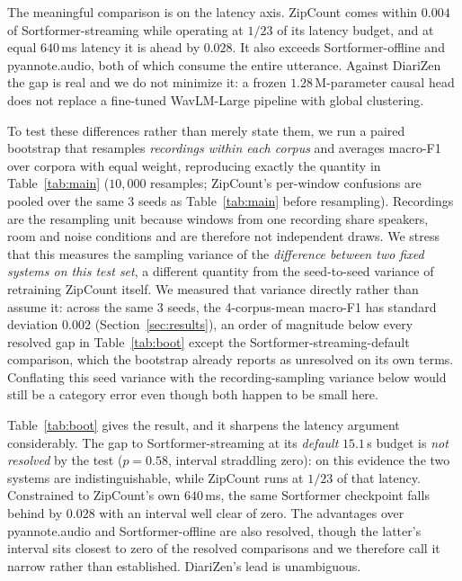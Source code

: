 \documentclass[journal]{IEEEtran}
\newcommand{\sys}{ZipCount}
\begin{document}
The meaningful comparison is on the latency axis. \sys{} comes within
$0.004$ of Sortformer-streaming while operating at $1/23$ of its latency
budget, and at equal $640$\,ms latency it is ahead by $0.028$. It also
exceeds Sortformer-offline and pyannote.audio, both of which consume the
entire utterance. Against DiariZen the gap is real and we do not minimize
it: a frozen $1.28$\,M-parameter causal head does not replace a fine-tuned
WavLM-Large pipeline with global clustering.

To test these differences rather than merely state them, we run a paired
bootstrap that resamples \emph{recordings within each corpus} and averages
macro-F1 over corpora with equal weight, reproducing exactly the quantity
in Table~\ref{tab:main} ($10{,}000$ resamples; \sys{}'s per-window
confusions are pooled over the same 3 seeds as Table~\ref{tab:main} before
resampling). Recordings are the resampling unit because windows from one
recording share speakers, room and noise conditions and are therefore not
independent draws. We stress that this measures the sampling variance of
the \emph{difference between two fixed systems on this test set}, a
different quantity from the seed-to-seed variance of retraining \sys{}
itself. We measured that variance directly rather than assume it: across
the same 3 seeds, the 4-corpus-mean macro-F1 has standard deviation
$0.002$ (Section~\ref{sec:results}), an order of magnitude below every
resolved gap in Table~\ref{tab:boot} except the Sortformer-streaming-default
comparison, which the bootstrap already reports as unresolved on its own
terms. Conflating this seed variance with the recording-sampling variance
below would still be a category error even though both happen to be small
here.

Table~\ref{tab:boot} gives the result, and it sharpens the latency argument
considerably. The gap to Sortformer-streaming at its \emph{default}
$15.1$\,s budget is \emph{not resolved} by the test ($p\!=\!0.58$, interval
straddling zero): on this evidence the two systems are indistinguishable,
while \sys{} runs at $1/23$ of that latency. Constrained to \sys{}'s own
$640$\,ms, the same Sortformer checkpoint falls behind by $0.028$ with an
interval well clear of zero. The advantages over pyannote.audio and
Sortformer-offline are also resolved, though the latter's interval sits
closest to zero of the resolved comparisons and we therefore call it
narrow rather than established.
DiariZen's lead is unambiguous.
\end{document}
